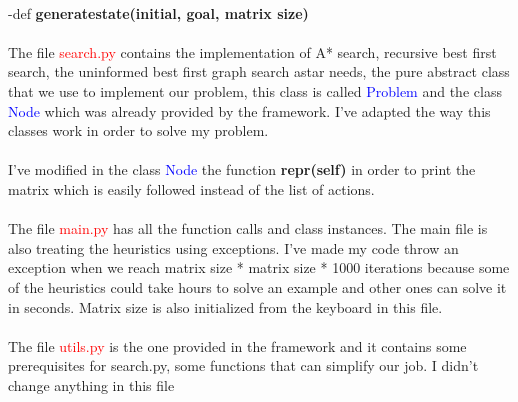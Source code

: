 \documentclass[14pt]{article}
\begin{document}
\\
-def \textbf{generatestate(initial, goal, matrix size)}
\\\\
The file \textcolor{red}{search.py} contains the implementation of A* search, recursive best first search, the uninformed best first graph search astar needs,  the pure abstract class that we use to implement our problem, this class is called \textcolor{blue}{Problem} and the class \textcolor{blue}{Node} which was already provided by the framework. I've adapted the way this classes work in order to solve my problem.
\\\\I've modified in the class \textcolor{blue}{Node} the function \textbf{repr(self)} in order to print the matrix which is easily followed instead of the list of actions.
\\\\
The file \textcolor{red}{main.py} has all the function calls and class instances. The main file is also treating the heuristics using exceptions. I've made my code throw an exception when we reach matrix size * matrix size * 1000 iterations because some of the heuristics could take hours to solve an example and other ones can solve it in seconds. Matrix size is also initialized from the keyboard in this file.
\\\\
The file \textcolor{red}{utils.py} is the one provided in the framework and it contains some prerequisites for search.py, some functions that can simplify our job. I didn't change anything in this file

\newpage
\end{document}
